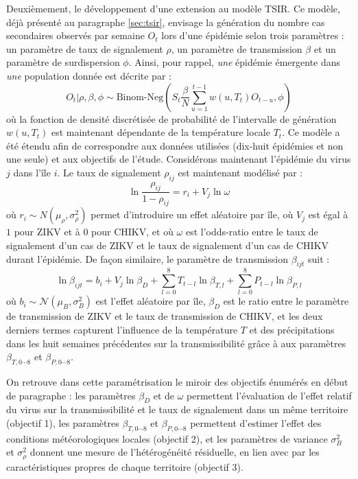 Deuxièmement, le développement d'une extension au modèle TSIR.
Ce modèle, déjà présenté au paragraphe \ref{sec:tsir}, envisage la génération du nombre cas secondaires observés par semaine $O_t$ lors d'une épidémie selon trois paramètres : un paramètre de taux de signalement $\rho$, un paramètre de transmission $\beta$ et un paramètre de surdispersion $\phi$.
Ainsi, pour rappel, \textit{une} épidémie émergente dans \textit{une} population donnée est décrite par :
\begin{equation} 
O_t|\rho,\beta,\phi \sim \text{Binom-Neg}\left(S_t\frac{\beta}{N} \sum_{u=1}^{t-1} w(u,T_t) O_{t-u}, \phi \right)
\end{equation}
où la fonction de densité discrétisée de probabilité de l'intervalle de génération $w(u,T_t)$ est maintenant dépendante de la température locale $T_t$.
Ce modèle a été étendu afin de correspondre aux données utilisées (dix-huit épidémies et non une seule) et aux objectifs de l'étude.
Considérons maintenant l'épidémie du virus $j$ dans l'île $i$.
Le taux de signalement $\rho_{ij}$ est maintenant modélisé par :
\begin{equation}
\ln \frac{\rho_{ij}}{1-\rho_{ij}}=   r_i   + V_{j}  \ln \omega 
\end{equation}
où $r_i \sim N(\mu_\rho, \sigma_\rho^2)$ permet d'introduire un effet aléatoire par île, où $V_j$ est égal à $1$ pour ZIKV et à $0$ pour CHIKV, et où $\omega$ est l'odds-ratio entre le taux de signalement d'un cas de ZIKV et le taux de signalement d'un cas de CHIKV durant l'épidémie. 
De façon similaire, le paramètre de transmission $\beta_{ijt}$ suit :
\begin{equation}
\label{eqn:beta}
\ln \beta_{ijt} = b_{i} + V_j \ln\beta_D   + \sum_{l=0}^{8} T_{t-l} \ln\beta_{T,l}  + \sum_{l=0}^{8} P_{t-l} \ln\beta_{P,l} 
\end{equation}
où $b_{i} \sim \mathcal{N}(\mu_{B}, \sigma_{B}^2)$ est l'effet aléatoire par île, $\beta_D$ est le ratio entre le paramètre de transmission de ZIKV et le taux de transmission de CHIKV, et les deux derniers termes capturent l'influence de la température $T$ et des précipitations dans les huit semaines précédentes sur la transmissibilité grâce à aux paramètres $\beta_{T,0\cdots8}$ et $\beta_{P,0\cdots8}$.

On retrouve dans cette paramétrisation le miroir des objectifs énumérés en début de paragraphe : les paramètres $\beta_D$ et de $\omega$ permettent l'évaluation de l'effet relatif du virus sur la transmissibilité et le taux de signalement dans un même territoire (objectif 1), les paramètres $\beta_{T,0\cdots8}$ et $\beta_{P,0\cdots8}$ permettent d'estimer l'effet des conditions météorologiques locales (objectif 2), et les paramètres de variance $\sigma_{B}^2$ et $\sigma_\rho^2$ donnent une mesure de l'hétérogénéité résiduelle, en lien avec par les caractéristiques propres de chaque territoire (objectif 3).

